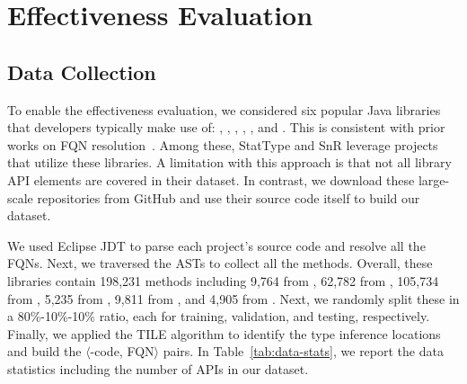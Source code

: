 \section{Effectiveness Evaluation}
\label{sec:effectiveness-eval}

\subsection{Data Collection}



To enable the effectiveness evaluation, we considered six popular Java libraries that developers typically make use of: , , , , , and . This is consistent with prior works on FQN resolution~\cite{icse18, snr-icse22, prompt-ase22}. Among these, StatType\cite{icse18} and SnR\cite{snr-icse22} leverage projects that utilize these libraries. A limitation with this approach is that not all library API elements are covered in their dataset. In contrast, we download these large-scale repositories from GitHub and use their source code itself to build our dataset.

We used Eclipse JDT to parse each project’s source code and resolve all the FQNs. Next, we traversed the ASTs to collect all the methods. Overall, these libraries contain 198,231 methods including 9,764 from , 62,782 from , 105,734 from , 5,235 from , 9,811 from , and 4,905 from . Next, we randomly split these in a 80\%-10\%-10\% ratio, each for training, validation, and testing, respectively. Finally, we applied the TILE algorithm to identify the type inference locations and build the $\langle$\blank-code, FQN$\rangle$ pairs. In Table~\ref{tab:data-stats}, we report the data statistics including the number of APIs in our dataset.








